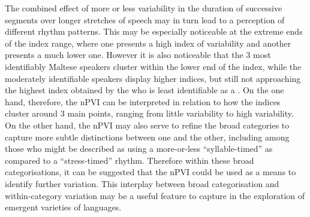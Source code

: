 \documentclass[output=paper]{langsci/langscibook}
\begin{document}
The combined effect of more or less variability in the duration of successive  segments over longer stretches of speech may in turn lead to a perception of different rhythm patterns. This may be especially noticeable at the extreme ends of the index range, where one  presents a high index of variability and another  presents a much lower one. However it is also noticeable that the 3 most identifiably Maltese speakers cluster within the lower end of the index, while the moderately identifiable speakers display higher indices, but still not approaching the highest index obtained by the  who is least identifiable as a  . On the one hand, therefore, the nPVI can be interpreted in relation to how the indices cluster around 3 main points, ranging from little variability to high variability. On the other hand, the nPVI may also serve to refine the broad categories to capture more subtle distinctions between one  and the other, including among those who might be described as using a more-or-less “syllable-timed” as compared to a “stress-timed” rhythm. Therefore within these broad categorisations, it can be suggested that the nPVI could be used as a means to identify further variation. This interplay between broad categorisation and within-category variation may be a useful feature to capture in the exploration of emergent varieties of languages. 
\end{document}
